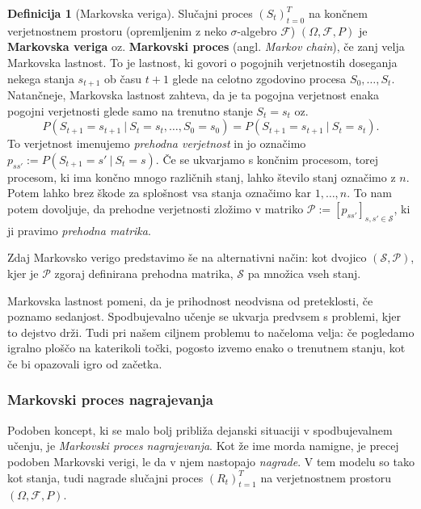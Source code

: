 \documentclass[12pt,a4paper]{amsart}
\theoremstyle{definition} %
\newtheorem{definicija}{Definicija}[section]
\theoremstyle{plain} %
\begin{document}
\begin{definicija}[Markovska veriga]\label{MarkovChain}
    Slučajni proces $(S_t)_{t=0}^T$ na končnem verjetnostnem prostoru (opremljenim z neko $\sigma$-algebro
    $\mathcal{F}$) $(\Omega, \mathcal{F}, P)$ je \textbf{Markovska veriga} oz. \textbf{Markovski proces} 
    (angl. \textit{Markov chain}), če zanj velja Markovska lastnost. To je lastnost, ki govori o 
    pogojnih verjetnostih doseganja nekega stanja $s_{t+1}$ ob času $t + 1$ glede na celotno zgodovino
    procesa $S_0, \dots, S_{t}$. Natančneje, Markovska lastnost zahteva, da je ta pogojna verjetnost 
    enaka pogojni verjetnosti glede samo na trenutno stanje $S_{t} = s_{t}$ oz.
    $$
    P(S_{t+1} = s_{t+1}~|~S_{t} = s_{t}, \dots, S_0 = s_0) = P(S_{t+1} = s_{t+1}~|~S_{t} = s_{t}).
    $$
    To verjetnost imenujemo \textit{prehodna verjetnost} in jo označimo $p_{ss'} := P(S_{t+1} = 
    s'~|~S_{t} = s)$. Če se ukvarjamo s končnim procesom, torej procesom, ki ima končno mnogo 
    različnih stanj, lahko število stanj označimo z $n$. Potem lahko brez škode za splošnost 
    vsa stanja označimo kar $1, \dots, n$. To nam potem dovoljuje, da prehodne verjetnosti zložimo v 
    matriko $\mathcal{P} := [p_{ss'}]_{s,s'\in \mathcal{S} }$, ki ji pravimo \textit{prehodna matrika}.

    Zdaj Markovsko verigo predstavimo še na alternativni način: kot dvojico $(\mathcal{S}, 
    \mathcal{P})$, kjer je $\mathcal{P}$ zgoraj definirana prehodna matrika, $\mathcal{S}$ pa 
    množica vseh stanj.
\end{definicija}

Markovska lastnost pomeni, da je prihodnost neodvisna od preteklosti, če poznamo sedanjost. 
Spodbujevalno učenje se ukvarja predvsem s problemi, kjer to dejstvo drži. Tudi pri našem 
ciljnem problemu to načeloma velja: če pogledamo igralno ploščo na katerikoli točki, pogosto 
izvemo enako o trenutnem stanju, kot če bi opazovali igro od začetka.

\subsubsection{Markovski proces nagrajevanja}
Podoben koncept, ki se malo bolj približa dejanski situaciji v spodbujevalnem učenju, je
\textit{Markovski proces nagrajevanja}. Kot že ime morda namigne, je precej podoben Markovski 
verigi, le da v njem nastopajo \textit{nagrade}. V tem modelu so tako kot stanja, tudi nagrade 
slučajni proces $(R_t)_{t=1}^T$ na verjetnostnem prostoru $(\Omega, \mathcal{F}, P)$.
\end{document}
